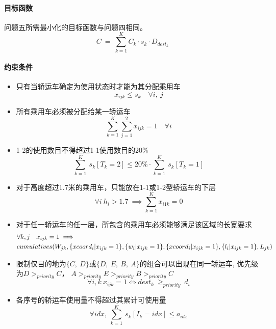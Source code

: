 \documentclass[UTF8，12pt]{ctexart}
\begin{document}
\paragraph{目标函数}
	问题五所需最小化的目标函数与问题四相同。
		\begin{equation}
					C \ = \ \sum_{k=1}^{K}C_k \cdot s_k \cdot D_{dest_k}
		\end{equation}
				
\paragraph{约束条件}
	\begin{itemize}
		\item 只有当轿运车确定为使用状态时才能为其分配乘用车
		\begin{equation}
		 x_{ijk} \leq s_k  \quad 	\forall i,~ j
		\end{equation}
		
		\item 所有乘用车必须被分配给某一轿运车
		\begin{equation}
			\sum_{k=1}^{K} \sum_{j=1}^{2} x_{ijk}=1 \quad \forall i
		\end{equation}
		
		\item 1-2的使用数目不得超过1-1使用数目的20\%
		\begin{equation}
			\sum_{k=1}^{K} \ s_k[T_k=2] \leq 20\% \cdot \sum_{k=1}^{K}  \ s_k[T_k=1]
		\end{equation}
		
		\item 对于高度超过1.7米的乘用车，只能放在1-1或1-2型轿运车的下层
		\begin{equation}
			\forall i \ h_i>1.7 \ \implies \sum_{k=1}^{K}x_{i1k}=0
		\end{equation}
		
		\item 对于任一轿运车的任一层，所包含的乘用车必须能够满足该区域的长宽要求
		\begin{align}
		&	\forall k, j \quad  x_{ijk}=1  \implies \notag\\
		&		 cumulatives(W_{jk}, \{xcoord_i | x_{ijk}=1 \},\{ w_i | x_{ijk}=1\},  \{xcoord_i | x_{ijk}=1 \}, \{l_i | x_{ijk}=1\}, L_{jk}) 
		\end{align}
		
		
		\item  限制仅目的地为$\{C,~D\}$或$\{D,~E,~B,~A\}$的组合可以出现在同一轿运车,
			优先级为$D >_{priority} C$， $A >_{priority} E >_{priority} B >_{priority} C $
		\begin{equation}
			\forall i,k \  x_{ijk}=1 \Leftrightarrow 	dest_k \ \geq_{priority} \ d_i
		\end{equation}
		
		\item 各序号的轿运车使用量不得超过其累计可使用量
		\begin{equation}
			\forall idx, ~ \sum_{k=1}^{K} \ s_k[I_k=idx] \leq a_{idx}
		\end{equation}
		
	\end{itemize}
\end{document}
